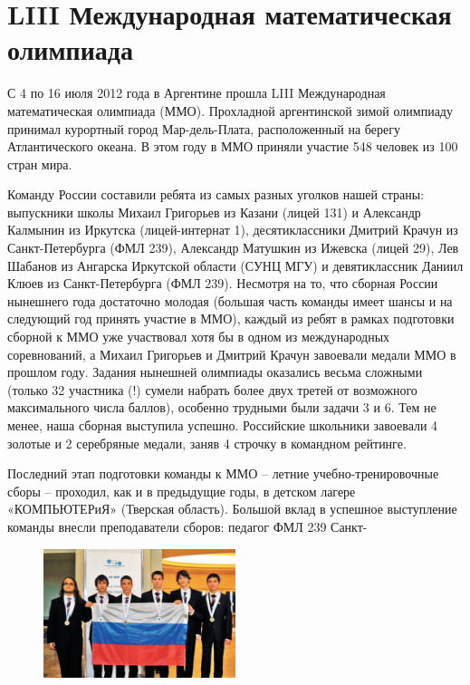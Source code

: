\documentclass[a4paper,12pt]{article}
\begin{document}
\setlength{\leftmargini}{12pt}
\setlength{\tabcolsep}{6pt}
\setlength{\intextsep}{15pt}  %
\fontsize{8}{12}\selectfont
{} %
\vspace*{\fill}
\section*{\centering LIII Международная математическая олимпиада}
\begin{multicols}{2}
    {\par \hspace*{0.2cm}С 4 по 16 июля 2012 года в Аргентине прошла LIII Международная математическая олимпиада (ММО). Прохладной аргентинской зимой олимпиаду принимал курортный город Мар-дель-Плата, расположенный на берегу Атлантического океана. В этом году в ММО приняли участие 548 человек из 100 стран мира.}
    {\par \hspace*{0.2cm}Команду России составили ребята из самых разных уголков нашей страны: выпускники школы Михаил Григорьев из Казани (лицей 131) и Александр Калмынин из Иркутска (лицей-интернат 1), десятиклассники Дмитрий Крачун из Санкт-Петербурга (ФМЛ 239), Александр Матушкин из Ижевска (лицей 29), Лев Шабанов из Ангарска Иркутской области (СУНЦ МГУ) и девятиклассник Даниил Клюев из Санкт-Петербурга (ФМЛ 239). Несмотря на то, что сборная России нынешнего года достаточно молодая (большая часть команды имеет шансы и на следующий год принять участие в ММО), каждый из ребят в рамках подготовки сборной к ММО уже участвовал хотя бы в одном из международных соревнований, а Михаил Григорьев и Дмитрий Крачун завоевали медали ММО в прошлом году. Задания нынешней олимпиады оказались весьма сложными (только 32 участника (!) сумели набрать более двух третей от возможного максимального числа баллов), особенно трудными были задачи 3 и 6. Тем не менее, наша сборная выступила успешно. Российские школьники завоевали 4 золотые и 2 серебряные медали, заняв 4 строчку в командном рейтинге.}
    {\par \hspace*{0.2cm}Последний этап подготовки команды к ММО – летние учебно-тренировочные сборы – проходил, как и в предыдущие годы, в детском лагере «КОМПЬЮТЕРиЯ» (Тверская область). Большой вклад в успешное выступление команды внесли преподаватели сборов: педагог ФМЛ 239 Санкт-}
    \newcolumn
    \columnbreak
    \begin{figure}[H]
        \centering
        \includegraphics[width=0.5\textwidth]{pic.png}

\end{figure}
\end{multicols}
\end{document}
